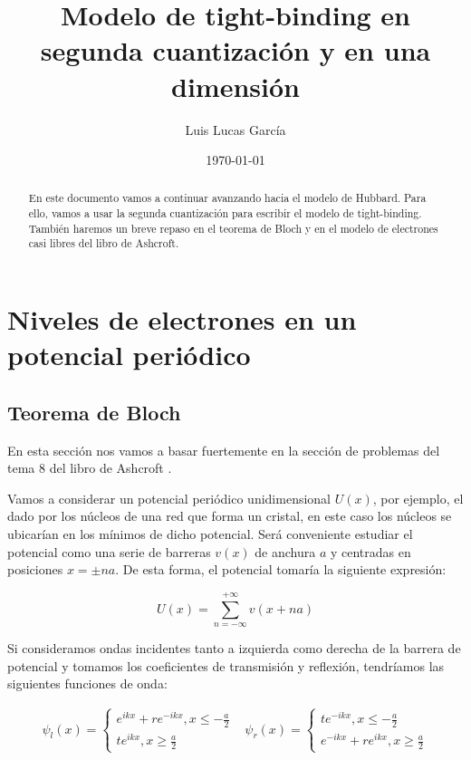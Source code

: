\documentclass{article} %
\author{Luis Lucas García}
\title{Modelo de tight-binding en segunda cuantización y en una dimensión}
\date{\today}
\begin{document}
\maketitle
\begin{abstract}
En este documento vamos a continuar avanzando hacia el modelo de Hubbard. Para ello, vamos a usar la segunda cuantización \cite{LuisAVQ} para escribir el modelo de tight-binding. También haremos un breve repaso en el teorema de Bloch y en el modelo de electrones casi libres del libro de Ashcroft. \cite{AshcroftSSP} 
\end{abstract}
\tableofcontents
\section{Niveles de electrones en un potencial periódico}
\subsection{Teorema de Bloch}
En esta sección nos vamos a basar fuertemente en la sección de problemas del tema 8 del libro de Ashcroft \cite{AshcroftSSP}.

Vamos a considerar un potencial periódico unidimensional $U(x)$, por ejemplo, el dado por los núcleos de una red que forma un cristal, en este caso los núcleos se ubicarían en los mínimos de dicho potencial. Será conveniente estudiar el potencial como una serie de barreras $v(x)$ de anchura $a$ y centradas en posiciones $x = \pm na$. De esta forma, el potencial tomaría la siguiente expresión:

\begin{equation}
U(x) = \sum_{n=-\infty}^{+\infty} v(x+na)
\end{equation}

Si consideramos ondas incidentes tanto a izquierda como derecha de la barrera de potencial y tomamos los coeficientes de transmisión y reflexión, tendríamos las siguientes funciones de onda:

\begin{equation}
\begin{array}{cc}
\psi_l(x) = \left\{ \begin{array}{c}
e^{ikx}+re^{-ikx}, x\leq -\frac{a}{2} \\
te^{ikx}, x\geq \frac{a}{2}
\end{array} \right. & \psi_r(x) = \left\{ \begin{array}{c}
te^{-ikx}, x\leq -\frac{a}{2} \\
e^{-ikx} + re^{ikx}, x\geq \frac{a}{2}
\end{array} \right.
\end{array}
\label{eq:waveFuncs}
\end{equation}
\end{document}
